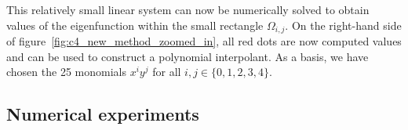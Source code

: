 This relatively small linear system can now be numerically solved to obtain values of the eigenfunction within the small rectangle $\Omega_{i,j}$. On the right-hand side of figure~\ref{fig:c4_new_method_zoomed_in}, all red dots are now computed values and can be used to construct a polynomial interpolant. As a basis, we have chosen the 25 monomials $x^i y^j$ for all $i,j \in \{0,1,2,3,4\}$.










\subsection{Numerical experiments}\label{sec:c4_numerical_experiments}

